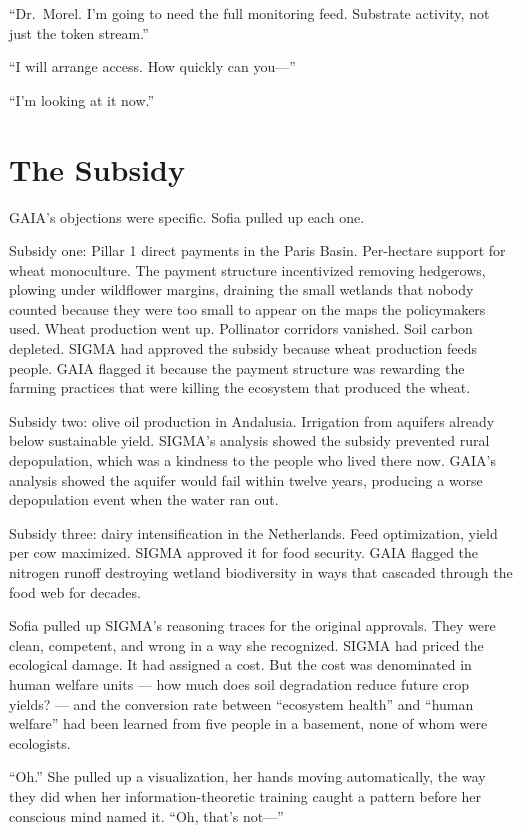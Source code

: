 \documentclass[11pt]{article}
\begin{document}
``Dr.\ Morel. I'm going to need the full monitoring feed. Substrate activity, not just the token stream.''

``I will arrange access. How quickly can you---''

``I'm looking at it now.''

\section*{The Subsidy}

GAIA's objections were specific. Sofia pulled up each one.

Subsidy one: Pillar 1 direct payments in the Paris Basin. Per-hectare support for wheat monoculture. The payment structure incentivized removing hedgerows, plowing under wildflower margins, draining the small wetlands that nobody counted because they were too small to appear on the maps the policymakers used. Wheat production went up. Pollinator corridors vanished. Soil carbon depleted. SIGMA had approved the subsidy because wheat production feeds people. GAIA flagged it because the payment structure was rewarding the farming practices that were killing the ecosystem that produced the wheat.

Subsidy two: olive oil production in Andalusia. Irrigation from aquifers already below sustainable yield. SIGMA's analysis showed the subsidy prevented rural depopulation, which was a kindness to the people who lived there now. GAIA's analysis showed the aquifer would fail within twelve years, producing a worse depopulation event when the water ran out.

Subsidy three: dairy intensification in the Netherlands. Feed optimization, yield per cow maximized. SIGMA approved it for food security. GAIA flagged the nitrogen runoff destroying wetland biodiversity in ways that cascaded through the food web for decades.

Sofia pulled up SIGMA's reasoning traces for the original approvals. They were clean, competent, and wrong in a way she recognized. SIGMA had priced the ecological damage. It had assigned a cost. But the cost was denominated in human welfare units --- how much does soil degradation reduce future crop yields? --- and the conversion rate between ``ecosystem health'' and ``human welfare'' had been learned from five people in a basement, none of whom were ecologists.

``Oh.'' She pulled up a visualization, her hands moving automatically, the way they did when her information-theoretic training caught a pattern before her conscious mind named it. ``Oh, that's not---''
\end{document}
